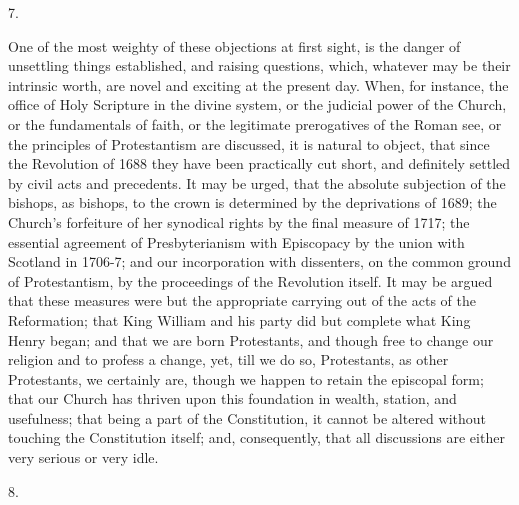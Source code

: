 7.

One of the most weighty of these objections at first sight, is the
danger of unsettling things established, and raising questions, which,
whatever may be their intrinsic worth, are novel and exciting at the
present day. When, for instance, the office of Holy Scripture in the
divine system, or the judicial power of the Church, or the
fundamentals of faith, or the legitimate prerogatives of the Roman
see, or the principles of Protestantism are discussed, it is natural
to object, that since the Revolution of 1688 they have been
practically cut short, and definitely settled by civil acts and
precedents. It may be urged, that the absolute subjection of the
bishops, as bishops, to the crown is determined by the deprivations of
1689; the Church's forfeiture of her synodical rights by the final
measure of 1717; the essential agreement of Presbyterianism with
Episcopacy by the union with Scotland in 1706-7; and our incorporation
with dissenters, on the common ground of Protestantism, by the
proceedings of the Revolution itself. It may be argued that these
measures were but the appropriate carrying out of the acts of the
Reformation; that King William and his party did but complete what
King Henry began; and that we are born Protestants, and though free to
change our religion and to profess a change, yet, till we do so,
Protestants, as other Protestants, we certainly are, though we happen
to retain the episcopal form; that our Church has thriven upon this
foundation in wealth, station, and usefulness; that being a part of
the Constitution, it cannot be altered without touching the
Constitution itself; and, consequently, that all discussions are
either very serious or very idle.

8.

